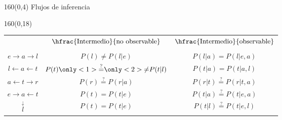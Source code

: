 \documentclass[shownotes,aspectratio=169]{beamer}
\begin{document}
\begin{frame}[plain]
\begin{textblock}{160}(0,4)
\centering \Large Flujos de inferencia
\end{textblock}

\begin{textblock}{160}(0,18)
\centering
 \begin{tabular}{c c|c}
 & $\hfrac{\text{Intermedio}}{\text{no observable}}$ &   $\hfrac{\text{Intermedio}}{\text{observable}}$ \\
 & & \\
 $ e \rightarrow a \rightarrow l $    & $P(l) \neq P(l|e)$ & $P(l|a) \overset{\phantom{?}}{=} P(l|e,a)$ \\ 
 $ l \leftarrow a \leftarrow t $      &  $P(t) \only<1>{\overset{?}{=}}\only<2>{\neq} P(t|l)$  & $P(t|a) \overset{\phantom{?}}{=} P(t|a,l)$ \\ 
 $ a \leftarrow t \rightarrow r $     & $P(r) \overset{?}{=} P(r|a)$ & $P(r|t) \overset{?}{=} P(r|t,a)$ \\
 $ e \rightarrow a \leftarrow t $     & $P(t) = P(t|e)$ & $P(t|a) \overset{?}{=} P(t|e,a)$ \\
            $\overset{\downarrow}{l}$  & $P(t) = P(t|e)$ & $P(t|l) \overset{?}{=} P(t|e,l)$
 \end{tabular} 
 \end{textblock}
 
\end{frame}
\end{document}
